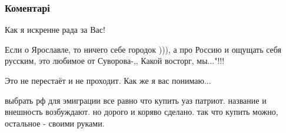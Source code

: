  
 
 
 
 
\subsubsection{Коментарі}
\label{sec:10_11_2021.fb.pikta_svetlana.1.obozhaju_jaroslavl.cmt}

\begin{minipage}{0.6\textwidth}
\begin{itemize} %
Как я искренне рада за Вас!

Если о Ярославле, то ничего себе городок ))), а про Россию и ощущать себя
русским, это любимое от Суворова-,, Какой восторг, мы..."!!!

Это не перестаёт и не проходит. Как же я вас понимаю...


выбрать рф для эмиграции все равно что купить уаз патриот. название и внешность
возбуждают. но дорого и коряво сделано. так что купить можно, остальное -
своими руками.

\end{itemize} %
\end{minipage}

